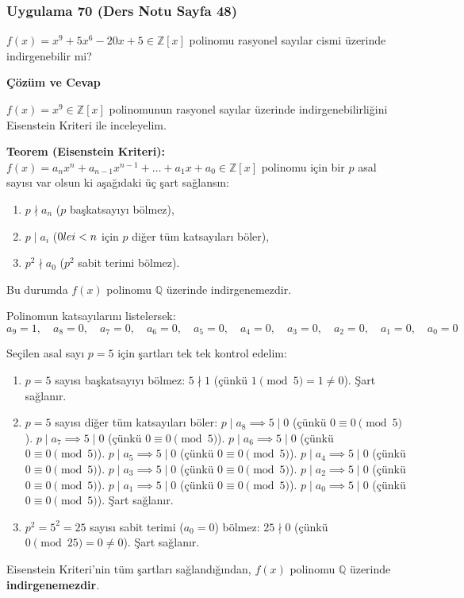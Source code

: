 \documentclass[11pt, a4paper]{article}
\newenvironment{cozum}{
    \vspace{0.5cm}
    \noindent\textcolor{green!60!black}{\faCheckCircle\enspace \textbf{\Large Çözüm ve Cevap}}\par\vspace{0.2cm}
}{}
\begin{document}
\newpage
\subsubsection{Uygulama 70 (Ders Notu Sayfa 48)}
\begin{sorubox}
$f(x) = x^9 + 5x^6 - 20x + 5 \in \mathbb{Z}[x]$ polinomu rasyonel sayılar cismi üzerinde indirgenebilir mi?
\end{sorubox}
\begin{cozum}
$f(x) = x^{9} \in \mathbb{Z}[x]$ polinomunun rasyonel sayılar üzerinde indirgenebilirliğini Eisenstein Kriteri ile inceleyelim.

\textbf{Teorem (Eisenstein Kriteri):} $f(x) = a_n x^n + a_{n-1} x^{n-1} + \dots + a_1 x + a_0 \in \mathbb{Z}[x]$ polinomu için bir $p$ asal sayısı var olsun ki aşağıdaki üç şart sağlansın:
\begin{enumerate}
    \item $p \nmid a_n$ ($p$ başkatsayıyı bölmez),
    \item $p \mid a_i$ ($0 \\le i < n$ için $p$ diğer tüm katsayıları böler),
    \item $p^2 \nmid a_0$ ($p^2$ sabit terimi bölmez).
\end{enumerate}
Bu durumda $f(x)$ polinomu $\mathbb{Q}$ üzerinde indirgenemezdir.

Polinomun katsayılarını listelersek:
\[ a_{9} = 1, \quad a_{8} = 0, \quad a_{7} = 0, \quad a_{6} = 0, \quad a_{5} = 0, \quad a_{4} = 0, \quad a_{3} = 0, \quad a_{2} = 0, \quad a_{1} = 0, \quad a_{0} = 0 \]

Seçilen asal sayı $p = 5$ için şartları tek tek kontrol edelim:
\begin{enumerate}
    \item $p = 5$ sayısı başkatsayıyı bölmez: $5 \nmid 1$ (çünkü $1 \pmod{5} = 1 \neq 0$). Şart sağlanır.
    \item $p = 5$ sayısı diğer tüm katsayıları böler:
    $p \mid a_{8} \implies 5 \mid 0$ (çünkü $0 \equiv 0 \pmod{5}$).
    $p \mid a_{7} \implies 5 \mid 0$ (çünkü $0 \equiv 0 \pmod{5}$).
    $p \mid a_{6} \implies 5 \mid 0$ (çünkü $0 \equiv 0 \pmod{5}$).
    $p \mid a_{5} \implies 5 \mid 0$ (çünkü $0 \equiv 0 \pmod{5}$).
    $p \mid a_{4} \implies 5 \mid 0$ (çünkü $0 \equiv 0 \pmod{5}$).
    $p \mid a_{3} \implies 5 \mid 0$ (çünkü $0 \equiv 0 \pmod{5}$).
    $p \mid a_{2} \implies 5 \mid 0$ (çünkü $0 \equiv 0 \pmod{5}$).
    $p \mid a_{1} \implies 5 \mid 0$ (çünkü $0 \equiv 0 \pmod{5}$).
    $p \mid a_{0} \implies 5 \mid 0$ (çünkü $0 \equiv 0 \pmod{5}$).
    Şart sağlanır.
    \item $p^2 = 5^2 = 25$ sayısı sabit terimi ($a_0 = 0$) bölmez: $25 \nmid 0$ (çünkü $0 \pmod{25} = 0 \neq 0$). Şart sağlanır.
\end{enumerate}

Eisenstein Kriteri'nin tüm şartları sağlandığından, $f(x)$ polinomu $\mathbb{Q}$ üzerinde \textbf{indirgenemezdir}.
\end{cozum}
\end{document}
